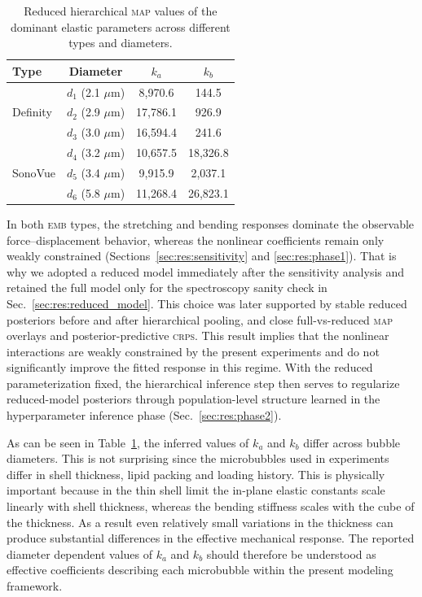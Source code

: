 \documentclass[%
 aip,
 jcp,
 amsmath,amssymb,
 preprint,%
]{revtex4-1}
\begin{document}
\begin{table}
\caption{\label{tab:map_parameters_reduced}
Reduced hierarchical \textsc{map} values of the dominant elastic parameters
across different types and diameters.}
\begin{ruledtabular}
\scriptsize
\begin{tabular}{lccc}
Type & Diameter & $k_a$ & $k_b$ \\
\hline
& $d_1$ (2.1 $\mu$m) & 8,970.6 & 144.5 \\
Definity & $d_2$ (2.9 $\mu$m) & 17,786.1 & 926.9 \\
& $d_3$ (3.0 $\mu$m) & 16,594.4 & 241.6 \\
\hline
& $d_4$ (3.2 $\mu$m) & 10,657.5 & 18,326.8 \\
SonoVue & $d_5$ (3.4 $\mu$m) & 9,915.9 & 2,037.1 \\
& $d_6$ (5.8 $\mu$m) & 11,268.4 & 26,823.1 \\
\end{tabular}
\end{ruledtabular}
\end{table}

In both \textsc{emb} types, the stretching and bending responses dominate the observable force--displacement behavior, whereas the nonlinear coefficients remain only weakly constrained (Sections~\ref{sec:res:sensitivity} and \ref{sec:res:phase1}). That is why we adopted a reduced model immediately after the sensitivity analysis and retained the full model only for the spectroscopy sanity check in Sec.~\ref{sec:res:reduced_model}. This choice was later supported by stable reduced posteriors before and after hierarchical pooling, and close full-vs-reduced \textsc{map} overlays and posterior-predictive \textsc{crps}. This result implies that the nonlinear interactions are weakly constrained by the present experiments and do not significantly improve the fitted response in this regime. With the reduced parameterization fixed, the hierarchical inference step then serves to regularize reduced-model posteriors through population-level structure learned in the hyperparameter inference phase (Sec.~\ref{sec:res:phase2}).

As can be seen in Table~\ref{tab:map_parameters_reduced}, the inferred values of $k_a$ and $k_b$ differ across bubble diameters. This is not surprising since the microbubbles used in experiments differ in shell thickness, lipid packing and loading history. This is physically important because in the thin shell limit the in-plane elastic constants scale linearly with shell thickness, whereas the bending stiffness scales with the cube of the thickness. As a result even relatively small variations in the thickness can produce substantial differences in the effective mechanical response. The reported diameter dependent values of $k_a$ and $k_b$ should therefore be understood as effective coefficients describing each microbubble within the present modeling framework.
\end{document}
